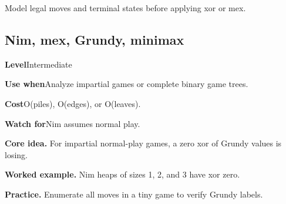 \documentclass[10pt,letterpaper]{article}
\newcommand{\entrylabel}[1]{\textcolor{accent}{\bfseries #1}}
\begin{document}
\begin{guidebox}Model legal moves and terminal states before applying xor or mex.\end{guidebox}
\subsection{Nim, mex, Grundy, minimax}
\begin{guidebox}\small
\entrylabel{Level}\quad Intermediate\par
\entrylabel{Use when}\quad Analyze impartial games or complete binary game trees.\par
\entrylabel{Cost}\quad O(piles), O(edges), or O(leaves).\par
\entrylabel{Watch for}\quad Nim assumes normal play.\par
\end{guidebox}
\noindent\textbf{Core idea.} For impartial normal-play games, a zero xor of Grundy values is losing.\par
\noindent\textbf{Worked example.} Nim heaps of sizes 1, 2, and 3 have xor zero.\par
\noindent\textbf{Practice.} Enumerate all moves in a tiny game to verify Grundy labels.\par
\end{document}
